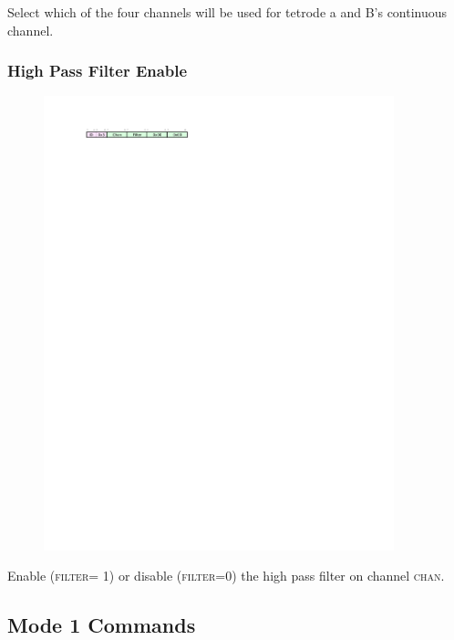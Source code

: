 Select which of the four channels will be used for tetrode a and B's continuous channel. 

\subsubsection{High Pass Filter Enable}
\begin{figure}[h!]
\includegraphics[width=4in]{setfilter.cmd.svg}
\end{figure}

Enable (\textsc{filter}= 1) or disable (\textsc{filter}=0) the high pass filter on channel \textsc{chan}. 


\subsection{Mode 1 Commands}
